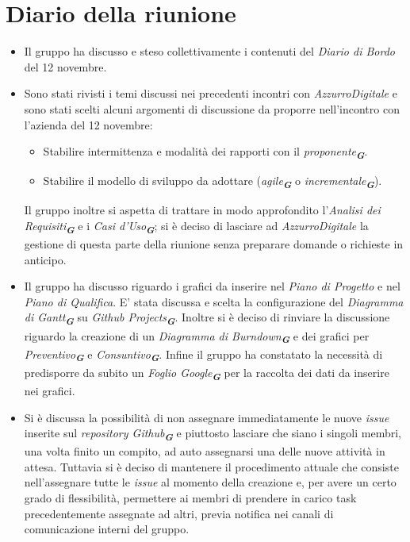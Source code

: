 

\section{Diario della riunione}

\begin{itemize}
    \item Il gruppo ha discusso e steso collettivamente i contenuti del \emph{Diario di Bordo} del 12 novembre.
    \item Sono stati rivisti i temi discussi nei precedenti incontri con \emph{AzzurroDigitale} e
    sono stati scelti alcuni argomenti di discussione da proporre nell'incontro con l'azienda del 12 novembre:
    \begin{itemize}
        \renewcommand{\labelitemii}{--}
        \item Stabilire intermittenza e modalità dei rapporti con il \emph{proponente}\textsubscript{\textit{\textbf{G}}}.
        \item Stabilire il modello di sviluppo da adottare (\emph{agile}\textsubscript{\textit{\textbf{G}}} o \emph{incrementale}\textsubscript{\textit{\textbf{G}}}).
    \end{itemize}
    Il gruppo inoltre si aspetta di trattare in modo approfondito l'\emph{Analisi dei Requisiti}\textsubscript{\textit{\textbf{G}}} e i \emph{Casi d'Uso}\textsubscript{\textit{\textbf{G}}}; 
    si è deciso di lasciare ad \emph{AzzurroDigitale} la gestione di questa parte della riunione senza preparare domande o richieste in anticipo.
    \item Il gruppo ha discusso riguardo i grafici da inserire nel \emph{Piano di Progetto} e nel \emph{Piano di Qualifica}.
    E' stata discussa e scelta la configurazione del \emph{Diagramma di Gantt}\textsubscript{\textit{\textbf{G}}} su \emph{Github Projects}\textsubscript{\textit{\textbf{G}}}.
    Inoltre si è deciso di rinviare la discussione riguardo la creazione di un \emph{Diagramma di Burndown}\textsubscript{\textit{\textbf{G}}} e dei grafici per \emph{Preventivo}\textsubscript{\textit{\textbf{G}}} e \emph{Consuntivo}\textsubscript{\textit{\textbf{G}}}.
    Infine il gruppo ha constatato la necessità di predisporre da subito un \emph{Foglio Google}\textsubscript{\textit{\textbf{G}}} per la raccolta dei dati da inserire nei grafici.
    \item Si è discussa la possibilità di non assegnare immediatamente le nuove \emph{issue} inserite sul \emph{repository Github}\textsubscript{\textit{\textbf{G}}} e piuttosto
    lasciare che siano i singoli membri, una volta finito un compito, ad auto assegnarsi una delle nuove attività in attesa.
    Tuttavia si è deciso di mantenere il procedimento attuale che consiste nell'assegnare tutte le \emph{issue} al momento della creazione e,
    per avere un certo grado di flessibilità, permettere ai membri di prendere in carico task precedentemente assegnate ad altri,
    previa notifica nei canali di comunicazione interni del gruppo.
\end{itemize}